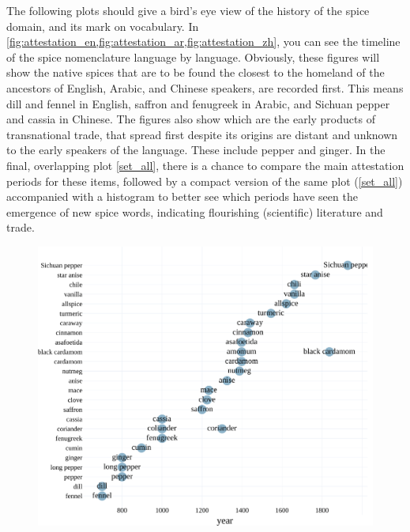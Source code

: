 The following plots should give a bird's eye view of the history of the spice domain, and its mark on vocabulary. In \cref{fig:attestation_en,fig:attestation_ar,fig:attestation_zh}, you can see the timeline of the spice nomenclature language by language. Obviously, these figures will show the native spices that are to be found the closest to the homeland of the ancestors of English, Arabic, and Chinese speakers, are recorded first. This means dill and fennel in English, saffron and fenugreek in Arabic, and Sichuan pepper and cassia in Chinese. The figures also show which are the early products of transnational trade, that spread first despite its origins are distant and unknown to the early speakers of the language. These include pepper and ginger. In the final, overlapping plot \cref{set_all}, there is a chance to compare the main attestation periods for these items, followed by a compact version of the same plot (\cref{set_all}) accompanied with a histogram to better see which periods have seen the emergence of new spice words, indicating flourishing (scientific) literature and trade. 



\begin{figure}[!ht]
  \centering
  \includegraphics[width=\linewidth]{imgs/plots/attestation_en.pdf}
  \caption{}
  \label{fig:attestation_en}
\end{figure}

